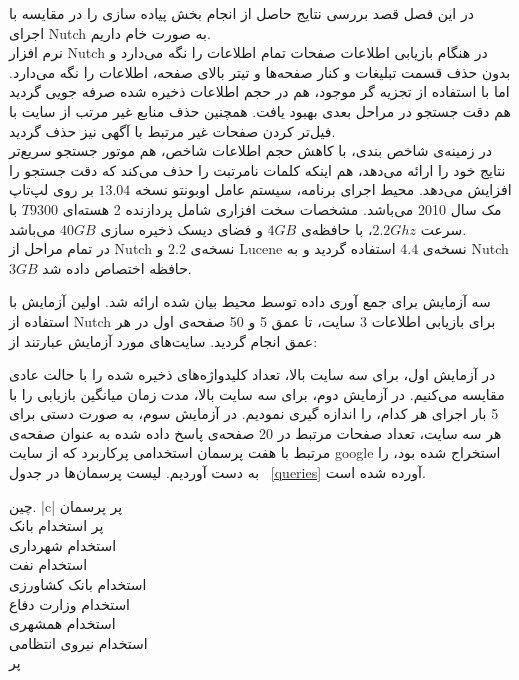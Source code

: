 
در این فصل قصد بررسی نتایج حاصل از انجام بخش پیاده سازی را در مقایسه با اجرای Nutch به صورت خام داریم.
\\
نرم افزار Nutch در هنگام بازیابی اطلاعات صفحات تمام اطلاعات را نگه می‌دارد و بدون حذف قسمت تبلیغات و کنار صفحه‌ها و تیتر بالای صفحه، اطلاعات را نگه می‌دارد. اما با استفاده از تجزیه گر موجود، هم در حجم اطلاعات ذخیره شده صرفه جویی گردید هم دقت جستجو در مراحل بعدی بهبود یافت. همچنین حذف منابع غیر مرتب از سایت با فیل‌تر کردن صفحات غیر مرتبط با آگهی نیز حذف گردید.
\\
در زمینه‌ی شاخص بندی، با کاهش حجم اطلاعات شاخص، هم موتور جستجو سریع‌تر نتایج خود را ارائه می‌دهد، هم اینکه کلمات نامرتبت را حذف می‌کند که دقت جستجو را افزایش می‌دهد.
محیط اجرای برنامه، سیستم عامل اوبونتو نسخه $13.04$ بر روی لپ‌تاپ مک سال 2010 می‌باشد. مشخصات سخت افزاری شامل پردازنده 2 هسته‌ای $T9300$ با سرعت $2.2 Ghz$، با حافظه‌ی $4 GB$ و فضای دیسک ذخیره سازی $40 GB$ می‌باشد.
\\
در تمام مراحل از Nutch نسخه‌ی $2.2$ و Lucene نسخه‌ی $4.4$ استفاده گردید و به Nutch $3 GB $ حافظه اختصاص داده شد.

سه آزمایش برای جمع آوری داده توسط محیط بیان شده ارائه شد. اولین آزمایش با استفاده از Nutch برای بازیابی اطلاعات 3 سایت، تا عمق 5 و 50 صفحه‌ی اول در هر عمق انجام گردید. سایت‌های مورد آزمایش عبارتند از:


در آزمایش اول، برای سه سایت بالا، تعداد کلیدواژه‌های ذخیره شده را با حالت عادی مقایسه می‌کنیم.
در آزمایش دوم، برای سه سایت بالا، مدت زمان میانگین بازیابی را با 5 بار اجرای هر کدام، را اندازه گیری نمودیم.
در آزمایش سوم، به صورت دستی برای هر سه سایت، تعداد صفحات مرتبط در 20 صفحه‌ی پاسخ داده شده به عنوان صفحه‌ی مرتبط با هفت پرسمان استخدامی پرکاربرد که از سایت google استخراج شده بود، را به دست آوردیم. لیست پرسمان‌ها در جدول  ~\ref{queries} آورده شده است.

‌چین.
 {|c|}
‌پر
پرسمان \\ ‌پر
استخدام بانک \\
استخدام شهرداری \\
استخدام نفت \\
استخدام بانک کشاورزی \\
استخدام وزارت دفاع \\
استخدام همشهری \\
استخدام نیروی انتظامی \\
‌پر

